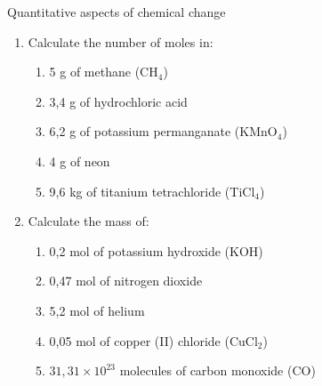 \begin{eocexercises}{Quantitative aspects of chemical change}
\begin{enumerate}[noitemsep, label=\textbf{\arabic*}. ]
\begin{enumerate}[noitemsep, label=\textbf{\alph*}. ]
\begin{enumerate}[noitemsep, label=\textbf{\alph*}. ]
\end{enumerate}
                \label{m38712*uid137}\item In the compound potassium sulphate ($\text{K}{}_{2}\text{SO}{}_{4}$), oxygen makes up x\% of the mass of the compound. x = ...
\label{m38712*id286432}\begin{enumerate}[noitemsep, label=\textbf{\alph*}. ] 
            \label{m38712*uid138}\item 36.8
\label{m38712*uid139}\item 9,2
\label{m38712*uid140}\item 4
\label{m38712*uid141}\item 18,3
\end{enumerate}
                \label{m38712*uid142}\item The concentration of a $150\phantom{\rule{2pt}{0ex}}{\text{cm}}^{3}$ solution, containing 5 g of $\text{NaCl}$ is...
\label{m38712*id286512}\begin{enumerate}[noitemsep, label=\textbf{\alph*}. ] 
            \label{m38712*uid143}\item $0,09\phantom{\rule{2pt}{0ex}}\text{M}$
\label{m38712*uid144}\item $5,7\phantom{\rule{2pt}{0ex}}\ensuremath{\times}10{}^{-4}\phantom{\rule{2pt}{0ex}}\text{M}$
\label{m38712*uid145}\item $0,57\phantom{\rule{2pt}{0ex}}\text{M}$
\label{m38712*uid146}\item $0,03\phantom{\rule{2pt}{0ex}}\text{M}$
\end{enumerate}
                \end{enumerate}
        \item Calculate the number of moles in:
\label{m38712*id6342}\begin{enumerate}[noitemsep, label=\textbf{\alph*}. ] 
            \item 5 g of methane (${\text{CH}}_{4}$)\item 3,4 g of hydrochloric acid\item 6,2 g of potassium permanganate (${\text{KMnO}}_{4}$)\item 4 g of neon\item 9,6 kg of titanium tetrachloride (${\text{TiCl}}_{4}$)\end{enumerate}
        \item Calculate the mass of:\label{m38712*id7342}\begin{enumerate}[noitemsep, label=\textbf{\alph*}. ] 
            \item 0,2 mol of potassium hydroxide ($\text{KOH}$)\item 0,47 mol of nitrogen dioxide\item 5,2 mol of helium\item 0,05 mol of copper (II) chloride (${\text{CuCl}}_{2}$)\item $31,31\ensuremath{\times}{10}^{23}$ molecules of carbon monoxide ($\text{CO}$)\end{enumerate}

\end{enumerate}
\end{eocexercises}
